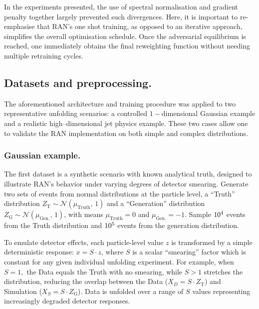 {{        In the experiments presented, the use of spectral normalisation and gradient penalty together largely prevented such divergences.
        Here, it is important to re-emphasise that RAN’s one shot training, as opposed to an iterative approach, simplifies the overall optimisation schedule.
        Once the adversarial equilibrium is reached, one immediately obtains the final reweighting function without needing multiple retraining cycles.
    
    \subsection{Datasets and preprocessing.}
        The aforementioned architecture and training procedure was applied to two representative unfolding scenarios: a controlled \(1-\)dimensional Gaussian example and a realistic high--dimensional jet physics example.
        These two cases allow one to validate the RAN implementation on both simple and complex distributions.

        \subsubsection{Gaussian example.}
            The first dataset is a synthetic scenario with known analytical truth, designed to illustrate RAN’s behavior under varying degrees of detector smearing.
            Generate two sets of events from normal distributions at the particle level, a ``Truth'' distribution $Z_{\text{T}} \sim \mathcal{N}(\mu_{\text{Truth}},\,1)$ and a ``Generation'' distribution $Z_{\text{G}} \sim \mathcal{N}(\mu_{\text{Gen.}},\,1)$, with means $\mu_{\text{Truth}}=0$ and $\mu_{\text{Gen.}}=-1$.
            Sample \(\num{d4}\) events from the Truth distribution and \(\num{d5}\) events from the generation distribution.
            
            To emulate detector effects, each particle-level value $z$ is transformed by a simple deterministic response: $x = S \cdot z$, where $S$ is a scalar ``smearing'' factor which is constant for any given individual unfolding experiment.
            For example, when $S=1,$ the Data equals the Truth with no smearing, while $S>1$ stretches the distribution, reducing the overlap between the Data ($X_D = S\cdot Z_{\text{T}}$) and Simulation ($X_S = S\cdot Z_{\text{G}}$).
            Data is unfolded over a range of \(S\) values representing increasingly degraded detector responses.
            
}}
